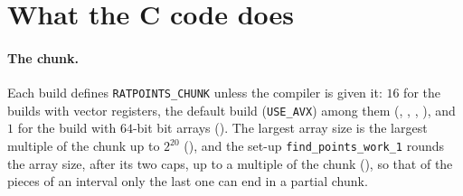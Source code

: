\section{What the C code does}\label{sec:rowsC}

\paragraph{The chunk.} Each build defines \verb|RATPOINTS_CHUNK| unless the compiler is given it:
$16$ for the builds with vector registers, the default build (\verb|USE_AVX|) among them
(, ,
, ), and $1$ for the build with
$64$-bit bit arrays (). The largest array size is the largest
multiple of the chunk up to $2^{20}$ (), and the set-up
\verb|find_points_work_1| rounds the array size, after its two caps, up to a multiple of the chunk
(), so that of the pieces of an interval only the last one can
end in a partial chunk.

